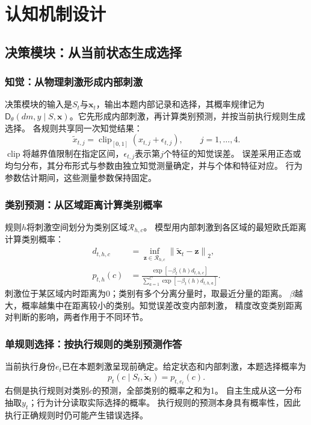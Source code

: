 \documentclass[11pt,a4paper]{article}
\numberwithin{equation}{section}
\newcommand{\norm}[1]{\left\lVert#1\right\rVert}
\newcommand{\clip}{\operatorname{clip}}
\newcommand{\Dd}{\mathsf{D}}
\begin{document}
\section{认知机制设计}
\label{sec:mechanisms}

\subsection{决策模块：从当前状态生成选择}
\label{sec:decision}

\subsubsection{知觉：从物理刺激形成内部刺激}
决策模块的输入是$S_t$与$\bm x_t$，输出本题内部记录和选择，其概率规律记为
$\Dd_\theta(dm,y\mid S,\bm x)$。它先形成内部刺激，再计算类别预测，并按当前执行规则生成选择。
各规则共享同一次知觉结果：
\begin{equation}
\widetilde x_{t,j}=\clip_{[0,1]}(x_{t,j}+\epsilon_{t,j}),\qquad j=1,\ldots,4.
\label{eq:perception}
\end{equation}
$\clip$将越界值限制在指定区间，$\epsilon_{t,j}$表示第$j$个特征的知觉误差。
误差采用正态或均匀分布，其分布形式与参数由独立知觉测量确定，并与个体和特征对应。
行为参数估计期间，这些测量参数保持固定。

\subsubsection{类别预测：从区域距离计算类别概率}
规则$h$将刺激空间划分为类别区域$\mathcal R_{h,c}$。
模型用内部刺激到各区域的最短欧氏距离计算类别概率：
\begin{align}
d_{t,h,c}&=\inf_{\bm z\in\mathcal R_{h,c}}\norm{\widetilde{\bm x}_t-\bm z}_2,\\
p_{t,h}(c)&=\frac{\exp[-\beta_t(h)d_{t,h,c}]}
{\sum_{a=1}^C\exp[-\beta_t(h)d_{t,h,a}]}.
\label{eq:category}
\end{align}
刺激位于某区域内时距离为0；类别有多个分离分量时，取最近分量的距离。
$\beta$越大，概率越集中在距离较小的类别。知觉误差改变内部刺激，
精度改变类别距离对判断的影响，两者作用于不同环节。


\subsubsection{单规则选择：按执行规则的类别预测作答}
当前执行身份$e_t$已在本题刺激呈现前确定。给定状态和内部刺激，本题选择概率为
\begin{equation}
p_t(c\mid S_t,\widetilde{\bm x}_t)=p_{t,e_t}(c).
\label{eq:choice}
\end{equation}
右侧是执行规则对类别$c$的预测，全部类别的概率之和为1。
自主生成从这一分布抽取$y_t$；行为计分读取实际选择的概率。
执行规则的预测本身具有概率性，因此执行正确规则时仍可能产生错误选择。
\end{document}

